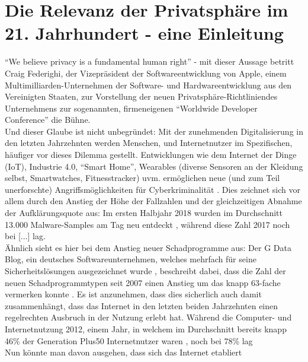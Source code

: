 \chapter{Die Relevanz der Privatsphäre im 21. Jahrhundert - eine Einleitung} %
\label{Introduction} %

\enquote{We believe privacy is a fundamental human right} \cite{WWDC:20} - mit dieser Aussage betritt Craig Federighi, der Vizepräsident der Softwareentwicklung von Apple, einem Multimilliarden-Unternehmen der Software- und Hardwareentwicklung aus den Vereinigten Staaten, zur Vorstellung der 
neuen Privatsphäre-Richtliniendes Unternehmens zur sogenannten, firmeneigenen \enquote{Worldwide Developer Conference} die Bühne. \\ Und dieser Glaube ist nicht unbegründet: Mit der zunehmenden Digitalisierung in den letzten Jahrzehnten werden Menschen, und Internetnutzer im Spezifischen, 
häufiger vor dieses Dilemma gestellt. Entwicklungen wie dem Internet der Dinge (IoT), Industrie 4.0, \enquote{Smart Home}, Wearables (diverse Sensoren an der Kleidung selbst, Smartwatches, Fitnesstracker) uvm. ermöglichen neue (und zum Teil unerforschte) Angriffsmöglichkeiten für Cyberkriminalität \cite{BLB:18}.
Dies zeichnet sich vor allem durch den Anstieg der Höhe der Fallzahlen und der gleichzeitigen Abnahme der Aufklärungsquote aus: Im ersten Halbjahr 2018 wurden im Durchschnitt 13.000 Malware-Samples am Tag neu entdeckt \cite{GDB:18}, während diese Zahl 2017 noch bei [...] lag. \\ Ähnlich sieht es hier bei
dem Anstieg neuer Schadprogramme aus: Der G Data Blog, ein deutsches Softwareunternehmen, welches mehrfach für seine Sicherheitslösungen ausgezeichnet wurde \cite{GD+1}, beschreibt dabei, dass die Zahl der neuen Schadprogrammtypen seit 2007 einen Anstieg um das knapp 63-fache vermerken konnte \cite{GDB:17}. 
Es ist anzunehmen, dass dies sicherlich auch damit zusammenhängt, dass das Internet in den letzten beiden Jahrzehnten einen regelrechten Ausbruch in der Nutzung erlebt hat. Während die Computer- und Internetnutzung 2012, einem Jahr, in welchem im Durchschnitt bereits knapp 46\% der Generation Plus50 Internetnutzer waren
\cite{GfK:2016aa}, noch bei 78\% lag   \\
Nun könnte man davon ausgehen, dass sich das Internet etabliert 
